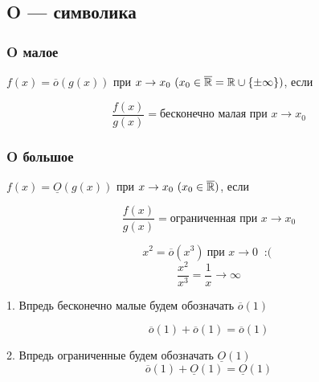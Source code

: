 \subsection{O --- символика}

\subsubsection{O малое}

\begin{definition}
    $f(x) = \overline{o}(g(x))$ при $x \to x_0\ (x_0 \in \overline{\mathbb{R}} = \mathbb{R} \cup \{\pm \infty \})$, если

    \[
        \frac{f(x)}{g(x)} = \text{бесконечно малая при } x \to x_0
    \]
\end{definition}

\subsubsection{O большое}

\begin{definition}
    $f(x) = \underline{O}(g(x))$ при $x \to x_0\ (x_0 \in \overline{\mathbb{R}})$, если

    \[
        \frac{f(x)}{g(x)} = \text{ограниченная при } x \to x_0
    \]
\end{definition}

\begin{example}
    \[
        x^2 = \overline{o}(x^3)\ \text{при } x \to 0\ \text{ :( }
    \]
    \[
        \frac{x^2}{x^3} = \frac{1}{x} \to \infty
    \]
\end{example}

\begin{remark}
    1. Впредь бесконечно малые будем обозначать $\overline{o}(1)$

    \[
        \overline{o}(1) + \overline{o}(1) = \overline{o}(1)
    \]

    2. Впредь ограниченные будем обозначать $\underline{O}(1)$
    \[
        \overline{o}(1) + \underline{O}(1) = \underline{O}(1)
    \]
\end{remark}
